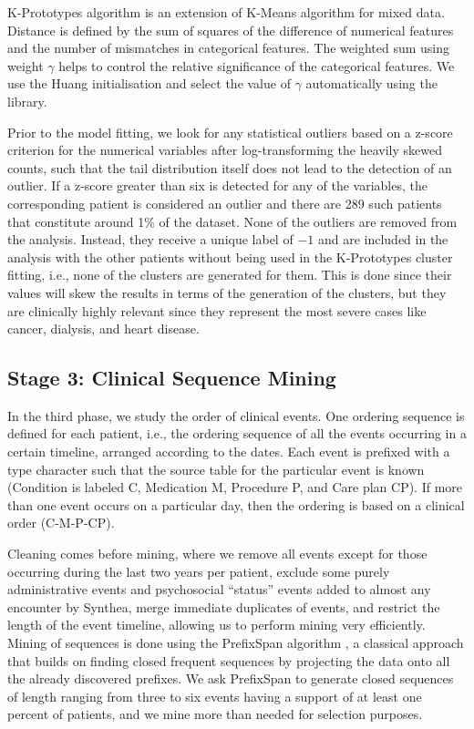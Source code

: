 K-Prototypes algorithm \cite{huang1998kprototypes} is an extension of K-Means algorithm for mixed data. Distance is defined by the sum of squares of the difference of numerical features and the number of mismatches in categorical features. The weighted sum using weight $\gamma$ helps to control the relative significance of the categorical features. We use the Huang initialisation and select the value of $\gamma$ automatically using the library.

Prior to the model fitting, we look for any statistical outliers based on a z-score criterion for the numerical variables after log-transforming the heavily skewed counts, such that the tail distribution itself does not lead to the detection of an outlier. If a z-score greater than six is detected for any of the variables, the corresponding patient is considered an outlier and there are 289 such patients that constitute around 1\% of the dataset. None of the outliers are removed from the analysis. Instead, they receive a unique label of $-1$ and are included in the analysis with the other patients without being used in the K-Prototypes cluster fitting, i.e., none of the clusters are generated for them. This is done since their values will skew the results in terms of the generation of the clusters, but they are clinically highly relevant since they represent the most severe cases like cancer, dialysis, and heart disease.

\subsection{Stage 3: Clinical Sequence Mining}

In the third phase, we study the order of clinical events. One ordering sequence is defined for each patient, i.e., the ordering sequence of all the events occurring in a certain timeline, arranged according to the dates. Each event is prefixed with a type character such that the source table for the particular event is known (Condition is labeled C, Medication M, Procedure P, and Care plan CP). If more than one event occurs on a particular day, then the ordering is based on a clinical order (C-M-P-CP).

Cleaning comes before mining, where we remove all events except for those occurring during the last two years per patient, exclude some purely administrative events and psychosocial ``status'' events added to almost any encounter by Synthea, merge immediate duplicates of events, and restrict the length of the event timeline, allowing us to perform mining very efficiently. Mining of sequences is done using the PrefixSpan algorithm \cite{pei2004prefixspan}, a classical approach that builds on finding closed frequent sequences by projecting the data onto all the already discovered prefixes. We ask PrefixSpan to generate closed sequences of length ranging from three to six events having a support of at least one percent of patients, and we mine more than needed for selection purposes.


